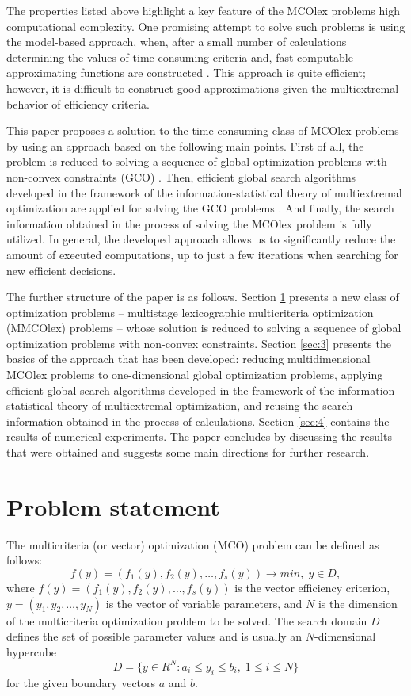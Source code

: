\documentclass[smallextended]{svjour3}       %
\begin{document}
The properties listed above highlight a key feature of the MCOlex problems   high computational complexity. One promising attempt to solve such problems is using the model-based approach, when, after a small number of calculations determining the values of time-consuming criteria and, fast-computable approximating functions are constructed \cite{c15,c16}. This approach is quite efficient; however, it is difficult to construct good approximations given the multiextremal behavior of efficiency criteria.

This paper proposes a solution to the time-consuming class of MCOlex problems by using an approach based on the following main points. First of all, the problem is reduced to solving a sequence of global optimization problems with non-convex constraints (GCO) \cite{c2,c14}. Then, efficient global search algorithms developed in the framework of the information-statistical theory of multiextremal optimization are applied for solving the GCO problems \cite{c17,c18}. And finally, the search information obtained in the process of solving the MCOlex problem is fully utilized. In general, the developed approach allows us to significantly reduce the amount of executed computations, up to just a few iterations when searching for new efficient decisions.

The further structure of the paper is as follows. Section \ref{sec:2} presents a new class of optimization problems -- multistage lexicographic multicriteria optimization (MMCOlex) problems -- whose solution is reduced to solving a sequence of global optimization problems with non-convex constraints. Section \ref{sec:3} presents the basics of the approach that has been developed: reducing multidimensional MCOlex problems to one-dimensional global optimization problems, applying efficient global search algorithms developed in the framework of the information-statistical theory of multiextremal optimization, and reusing the search information obtained in the process of calculations. Section \ref{sec:4} contains the results of numerical experiments. The paper concludes by discussing the results that were obtained and suggests some main directions for further research.

\section{Problem statement}
\label{sec:2}

The multicriteria (or vector) optimization (MCO) problem can be defined as follows:
\begin{equation}\label{eq:1}
f(y) = (f_1(y), f_2(y), \dots , f_s(y)) \to min, \; y \in D,
\end{equation}
where $f(y) = (f_1(y), f_2(y), \dots , f_s(y))$ is the vector efficiency criterion, $y = (y_1, y_2, \dots , y_N)$ is the vector of variable parameters, and $N$ is the dimension of the multicriteria optimization problem to be solved. The search domain $D$ defines the set of possible parameter values and is usually an $N$-dimensional hypercube
\begin{equation}\label{eq:2}
D  = \{ y\in R^N: a_i \leq y_i \leq b_i, \; 1 \leq i \leq N \}
\end{equation}
for the given boundary vectors $a$ and $b$.
\end{document}
